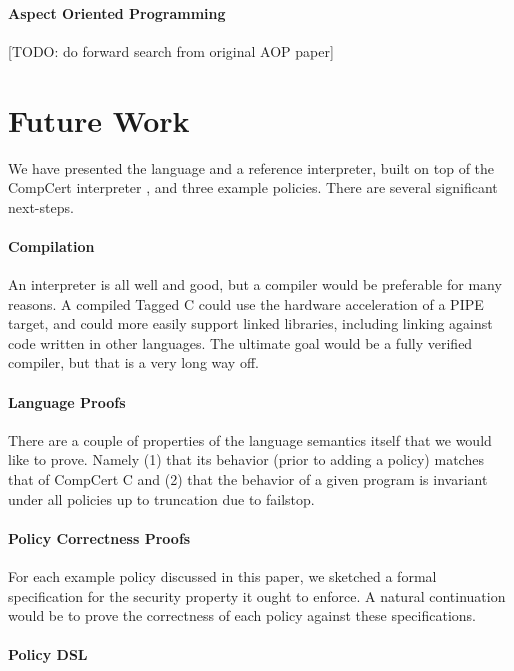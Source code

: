 \documentclass{llncs}
\begin{document}
\paragraph{Aspect Oriented Programming}

[TODO: do forward search from original AOP paper]

\section{Future Work}
\label{sec:futurework}

We have presented the language and a reference interpreter, built on top of the CompCert interpreter
\cite{Leroy09:CompCert}, and three example policies. There are several significant next-steps.

\paragraph{Compilation}

An interpreter is all well and good, but a compiler would be preferable for many reasons.
A compiled Tagged C could use the hardware acceleration of a PIPE target, and could more easily
support linked libraries, including linking against code written in other languages.
The ultimate goal would be a fully verified compiler, but that is a very long way off.

\paragraph{Language Proofs}

There are a couple of properties of the language semantics itself that we would like to prove.
Namely (1) that its behavior (prior to adding a policy) matches that of CompCert C and
(2) that the behavior of a given program is invariant under all policies up to truncation due
to failstop.

\paragraph{Policy Correctness Proofs}

For each example policy discussed in this paper, we sketched a formal specification for the
security property it ought to enforce. A natural continuation would be to prove the correctness
of each policy against these specifications.

\paragraph{Policy DSL}
\end{document}
